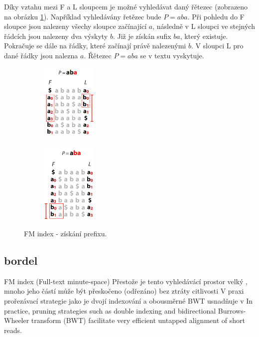 \documentclass[czech,DP]{thesiskiv}
\numberwithin{equation}{section}
\begin{document}
\noindent
Díky vztahu mezi F a L sloupcem je možné vyhledávat daný řětezec (zobrazeno na obrázku \ref{fig:fm_index}). Například vyhledávány řetězec bude $P = aba$. Při pohledu do F sloupce jsou nalezeny všechy sloupce začínající $a$, následně v L sloupci ve stejných řádcích jsou nalezeny dva výskyty $b$. Již je získán sufix $ba$, který existuje. Pokračuje se dále na řádky, které začínají právě nalezenými $b$. V sloupci L pro dané řádky jsou nalezna $a$. Řětezec $P = aba$ se v textu vyskytuje. 

\begin{figure}[H]
		\centering
		\begin{subfigure}[t]{.4\textwidth}
			\centering
			\includegraphics[width=100px]{./img/FM_index_1.png}
		\end{subfigure}
		\begin{subfigure}[t]{.4\textwidth}
			\centering
			\includegraphics[width=100px]{./img/FM_index_2.png}
		\end{subfigure}	
		\caption{FM index - získání prefixu. \cite{bw_transform}}
		\label{fig:fm_index}
\end{figure}







\subsection{bordel}

FM index (Full-text minute-space) 
Přestože je tento vyhledávácí prostor velký , mnoho jeho částí může být přeskočeno (odřezáno) bez ztráty citlivosti
V praxi prořezávací strategie jako je dvojí indexování a obousměrné BWT usnadňuje v In practice, pruning strategies such as double indexing and bidirectional Burrows-Wheeler transform (BWT) facilitate very efficient untapped alignment of short reads.
\end{document}
